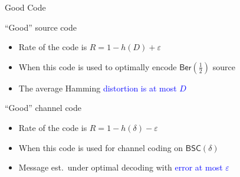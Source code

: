 \documentclass[10pt,presentation]{beamer}
\begin{document}
\begin{frame}{Good Code}
  \begin{block}{``Good'' source code}
    \begin{itemize}
    \item Rate of the code is $R=1-h(D)+\varepsilon$
    \item When this code is used to \alert{optimally encode} $\mathsf{Ber}(\tfrac{1}{2})$ source
    \item The average Hamming \textcolor{blue}{distortion is at most $D$}
    \end{itemize}
  \end{block}
  \vspace{0.4cm}
  \begin{block}{``Good'' channel code}
    \begin{itemize}
    \item Rate of the code is $R=1-h(\delta)-\varepsilon$
    \item When this code is used for channel coding on $\mathsf{BSC}(\delta)$
    \item Message est.~under \alert{optimal decoding} with \textcolor{blue}{error at most $\varepsilon$}
    \end{itemize}
  \end{block}
\end{frame}
\end{document}
